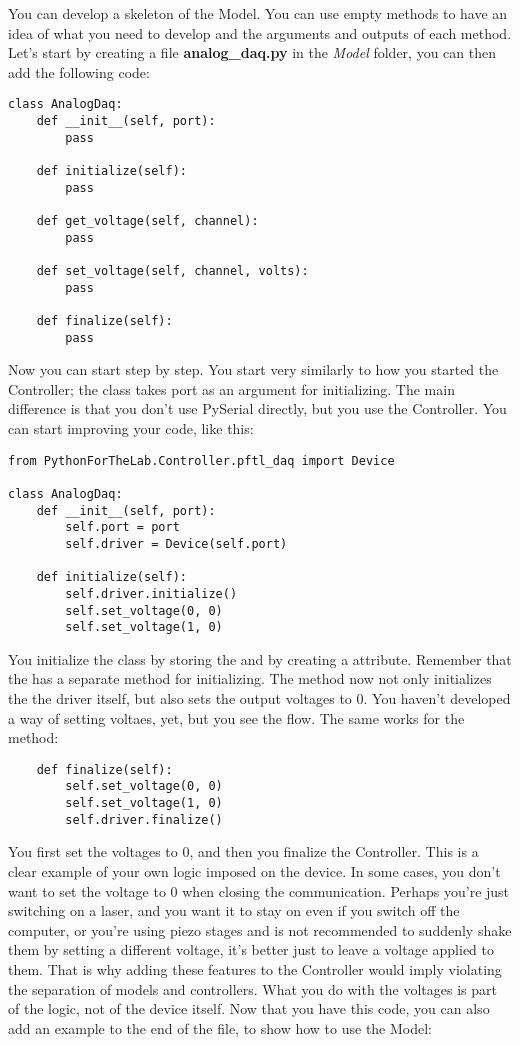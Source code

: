 You can develop a skeleton of the Model. You can use empty methods to have an idea of what you need to develop and the arguments and outputs of each method. Let's start by creating a file \textbf{analog\_daq.py} in the \emph{Model} folder, you can then add the following code:

\begin{verbatim}
class AnalogDaq:
    def __init__(self, port):
        pass

    def initialize(self):
        pass

    def get_voltage(self, channel):
        pass

    def set_voltage(self, channel, volts):
        pass

    def finalize(self):
        pass
\end{verbatim}

Now you can start step by step. You start very similarly to how you started the Controller; the  class takes port as an argument for initializing. The main difference is that you don't use PySerial directly, but you use the Controller. You can start improving your code, like this:

\begin{verbatim}
from PythonForTheLab.Controller.pftl_daq import Device

class AnalogDaq:
    def __init__(self, port):
        self.port = port
        self.driver = Device(self.port)

    def initialize(self):
        self.driver.initialize()
        self.set_voltage(0, 0)
        self.set_voltage(1, 0)
\end{verbatim}

You initialize the class by storing the  and by creating a  attribute. Remember that the  has a separate method for initializing. The  method now not only initializes the the driver itself, but also sets the output voltages to 0. You haven't developed a way of setting voltaes, yet, but you see the flow. The same works for the  method:

\begin{verbatim}
    def finalize(self):
        self.set_voltage(0, 0)
        self.set_voltage(1, 0)
        self.driver.finalize()
\end{verbatim}

You first set the voltages to $0$, and then you finalize the Controller. This is a clear example of your own logic imposed on the device. In some cases, you don't want to set the voltage to 0 when closing the communication. Perhaps you're just switching on a laser, and you want it to stay on even if you switch off the computer, or you're using piezo stages and is not recommended to suddenly shake them by setting a different voltage, it's better just to leave a voltage applied to them. That is why adding these features to the Controller would imply violating the separation of models and controllers. What you do with the voltages is part of the logic, not of the device itself. Now that you have this code, you can also add an example to the end of the file, to show how to use the Model:

